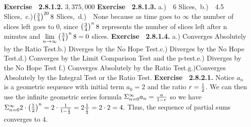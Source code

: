  {\noindent \protect \bf  Exercise ~2.8.1.2.} $3,375,000$ \protect \newline  \protect \newline  
 {\noindent \protect \bf  Exercise ~2.8.1.3.} a.)~~6 Slices,~b.)~~4.5 Slices,~c.)$\left (\protect \frac  {3}{4} \right )^{20} 8$ Slices,~d.)~~None because as time goes to $\infty $ the number of slices left goes to 0, since $ \left (\protect \frac  {3}{4} \right )^{n} 8$ represents the number of slices left after n minutes and $\protect \qopname  \relax m{lim}\limits _{n \to \infty }{ \left (\protect \frac  {3}{4} \right )^{n} 8} = 0$ slices. \protect \newline  \protect \newline  
 {\noindent \protect \bf  Exercise ~2.8.1.4.} a.) Converges Absolutely by the Ratio Test.\protect \newline  b.) Diverges by the No Hope Test.\protect \newline  c.) Diverges by the No Hope Test.\protect \newline  d.) Converges by the Limit Comparison Test and the p-test.\protect \newline  e.) Diverges by the No Hope Test \protect \newline  f.) Converges Absolutely by the Ratio Test.\protect \newline  g.)Converges Absolutely by the Integral Test or the Ratio Test. \protect \newline  \protect \newline  
 {\noindent \protect \bf  Exercise ~2.8.2.1.} Notice $a_n$ is a geometric sequence with initial term $a_0=2$ and the ratio $r=\protect \frac  {1}{2}$. We can then use the infinite geometric series formula $\Sigma _{n=0}^\infty {a_n}= \protect \frac  {a}{1-r}$ so we have $\Sigma _{n=0}^\infty {2\cdot \left (\protect \frac  {1}{2}\right )^n} = 2 \cdot \protect \frac  {1}{1-\protect \frac  {1}{2}} = 2 \protect \frac  {1}{\protect \frac  {1}{2}} = 2 \cdot 2 = 4.$ Thus, the sequence of partial sums converges to $4$. \protect \newline  \protect \newline  
